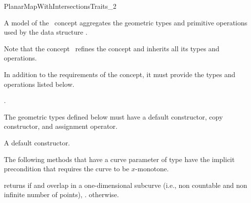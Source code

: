 
\ccRefPageBegin

\begin{ccRefConcept}{PlanarMapWithIntersectionsTraits_2}

\ccDefinition
A model of the \ccRefName\ concept aggregates the geometric types and
primitive operations used by the data structure
.

Note that the concept \ccRefName\ refines the concept 
and inherits all its types and operations.

In addition to the requirements of the  concept, it must
provide the types and operations listed below.

\ccRefines
{} .

\ccTypes

The geometric types defined below must have a default constructor,
copy constructor, and assignment operator.



\ccCreation
    
{A default constructor.}

\ccOperations

The following methods that have a curve parameter of type
 have the implicit precondition that requires the
curve to be $x$-monotone.

         {returns  if  and  overlap
          in a one-dimensional subcurve (i.e., non countable and non infinite
	  number of points), . otherwise.}


\end{ccRefConcept}
